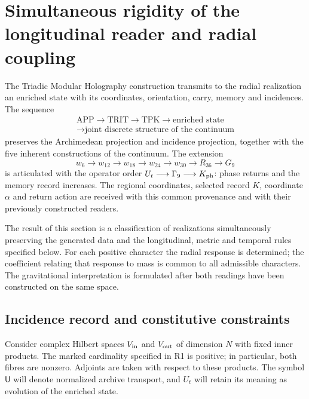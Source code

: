 \section{Simultaneous rigidity of the longitudinal reader and radial coupling}
\label{g26:sec:rigidez-radial-es}

The Triadic Modular Holography construction transmits to the radial realization an enriched state with its coordinates, orientation, carry, memory and incidences. The sequence
\[
 \begin{gathered}
 \mathrm{APP}\longrightarrow\mathrm{TRIT}\longrightarrow\mathrm{TPK}
 \longrightarrow\text{enriched state}\\
 \longrightarrow\text{joint discrete structure of the continuum}
 \end{gathered}
\]
preserves the Archimedean projection and incidence projection, together with the five inherent constructions of the continuum. The extension
\[
 w_6\longrightarrow w_{12}\longrightarrow w_{18}\longrightarrow
 w_{24}\longrightarrow w_{30}\longrightarrow R_{36}\longrightarrow G_9
\]
is articulated with the operator order \(U_t\longrightarrow\Gamma_9\longrightarrow K_{\rm ph}\): phase returns and the memory record increases. The regional coordinates, selected record \(K\), coordinate \(\alpha\) and return action are received with this common provenance and with their previously constructed readers.

The result of this section is a classification of realizations simultaneously preserving the generated data and the longitudinal, metric and temporal rules specified below. For each positive character the radial response is determined; the coefficient relating that response to mass is common to all admissible characters. The gravitational interpretation is formulated after both readings have been constructed on the same space.

\subsection{Incidence record and constitutive constraints}

Consider complex Hilbert spaces \(V_{\rm in}\) and \(V_{\rm out}\) of dimension \(N\) with fixed inner products. The marked cardinality specified in R1 is positive; in particular, both fibres are nonzero. Adjoints are taken with respect to these products. The symbol \(\mathsf U\) will denote normalized archive transport, and \(U_t\) will retain its meaning as evolution of the enriched state.


